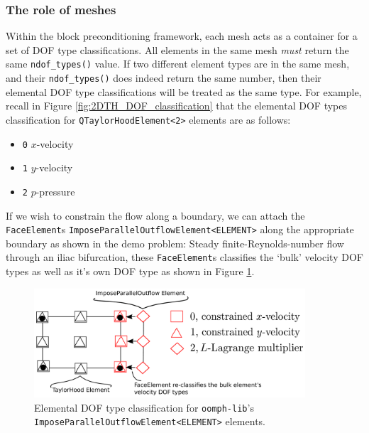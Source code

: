 \subsubsection{The role of meshes}

Within the block preconditioning framework, each mesh acts as a container for 
a set of DOF type classifications. All elements in the same mesh \emph{must} 
return the same \texttt{ndof\_\allowbreak types()} value. If two different 
element types are in the same mesh, and their \texttt{ndof\_\allowbreak types()}
does indeed return the same number, then their elemental DOF type 
classifications will be treated as the same type. For example, recall in 
Figure \ref{fig:2DTH_DOF_classification} that the elemental DOF types 
classification for \texttt{Q\allowbreak TaylorHood\allowbreak Element<2>} 
elements are as follows:
\begin{itemize}
  \item \texttt{0} $x$-velocity
  \item \texttt{1} $y$-velocity
  \item \texttt{2} $p$-pressure
\end{itemize}
If we wish to constrain the flow along a boundary, we can attach the 
\texttt{Face\allowbreak Element}s 
\texttt{Impose\allowbreak Parallel\allowbreak Outflow\allowbreak Element<ELEMENT>} 
along the appropriate boundary as shown in the demo problem: Steady 
finite-Reynolds-number flow through an iliac bifurcation, these 
\texttt{Face\allowbreak Element}s classifies the `bulk' velocity DOF types 
as well as it's own DOF type as shown in Figure 
\ref{fig:2DFACE_DOF_classification}.
\begin{figure}[H]
\centering
\includegraphics[width=0.9\textwidth]{./pic/faceelemenet_dof_classification.pdf}
\caption{Elemental DOF type classification for \texttt{oomph-\allowbreak lib}'s 
 \texttt{Impose\allowbreak Parallel\allowbreak Outflow\allowbreak Element<ELEMENT>} elements.}
\label{fig:2DFACE_DOF_classification}
\end{figure}

